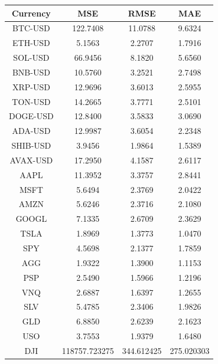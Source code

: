 \documentclass{ledger}
\begin{document}
\begin{table}[h]
\centering
\begin{tabular}{|c|c|c|c|}
\hline
\textbf{Currency} & \textbf{MSE} & \textbf{RMSE} & \textbf{MAE} \\ \hline
BTC-USD            & 122.7408     & 11.0788       & 9.6324       \\ \hline
ETH-USD            & 5.1563       & 2.2707        & 1.7916       \\ \hline
SOL-USD            & 66.9456      & 8.1820        & 5.6560       \\ \hline
BNB-USD            & 10.5760      & 3.2521        & 2.7498       \\ \hline
XRP-USD            & 12.9696      & 3.6013        & 2.5955       \\ \hline
TON-USD            & 14.2665      & 3.7771        & 2.5101       \\ \hline
DOGE-USD           & 12.8400      & 3.5833        & 3.0690       \\ \hline
ADA-USD            & 12.9987      & 3.6054        & 2.2348       \\ \hline
SHIB-USD           & 3.9456       & 1.9864        & 1.5389       \\ \hline
AVAX-USD           & 17.2950      & 4.1587        & 2.6117       \\ \hline
AAPL               & 11.3952      & 3.3757        & 2.8441       \\ \hline
MSFT               & 5.6494       & 2.3769        & 2.0422       \\ \hline
AMZN               & 5.6246       & 2.3716        & 2.1080       \\ \hline
GOOGL              & 7.1335       & 2.6709        & 2.3629       \\ \hline
TSLA               & 1.8969       & 1.3773        & 1.0470       \\ \hline
SPY                & 4.5698       & 2.1377        & 1.7859       \\ \hline
AGG                & 1.9322       & 1.3900        & 1.1153       \\ \hline
PSP                & 2.5490       & 1.5966        & 1.2196       \\ \hline
VNQ                & 2.6887       & 1.6397        & 1.2655       \\ \hline
SLV                & 5.4785       & 2.3406        & 1.9826       \\ \hline
GLD                & 6.8850       & 2.6239        & 2.1623       \\ \hline
USO                & 3.7553       & 1.9379        & 1.6480       \\ \hline
DJI                & 118757.723275       & 344.612425        & 275.020303       \\ \hline
\hline
\end{tabular}
\end{table}
\end{document}

